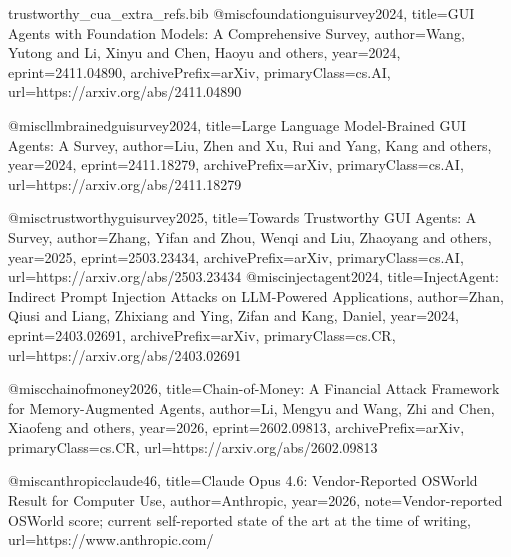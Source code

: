 \begin{filecontents*}{trustworthy_cua_extra_refs.bib}
@misc{foundationguisurvey2024,
  title={GUI Agents with Foundation Models: A Comprehensive Survey},
  author={Wang, Yutong and Li, Xinyu and Chen, Haoyu and others},
  year={2024},
  eprint={2411.04890},
  archivePrefix={arXiv},
  primaryClass={cs.AI},
  url={https://arxiv.org/abs/2411.04890}
}

@misc{llmbrainedguisurvey2024,
  title={Large Language Model-Brained GUI Agents: A Survey},
  author={Liu, Zhen and Xu, Rui and Yang, Kang and others},
  year={2024},
  eprint={2411.18279},
  archivePrefix={arXiv},
  primaryClass={cs.AI},
  url={https://arxiv.org/abs/2411.18279}
}

@misc{trustworthyguisurvey2025,
  title={Towards Trustworthy GUI Agents: A Survey},
  author={Zhang, Yifan and Zhou, Wenqi and Liu, Zhaoyang and others},
  year={2025},
  eprint={2503.23434},
  archivePrefix={arXiv},
  primaryClass={cs.AI},
  url={https://arxiv.org/abs/2503.23434}
}
@misc{injectagent2024,
  title={InjectAgent: Indirect Prompt Injection Attacks on LLM-Powered Applications},
  author={Zhan, Qiusi and Liang, Zhixiang and Ying, Zifan and Kang, Daniel},
  year={2024},
  eprint={2403.02691},
  archivePrefix={arXiv},
  primaryClass={cs.CR},
  url={https://arxiv.org/abs/2403.02691}
}

@misc{chainofmoney2026,
  title={Chain-of-Money: A Financial Attack Framework for Memory-Augmented Agents},
  author={Li, Mengyu and Wang, Zhi and Chen, Xiaofeng and others},
  year={2026},
  eprint={2602.09813},
  archivePrefix={arXiv},
  primaryClass={cs.CR},
  url={https://arxiv.org/abs/2602.09813}
}

@misc{anthropicclaude46,
  title={Claude Opus 4.6: Vendor-Reported OSWorld Result for Computer Use},
  author={{Anthropic}},
  year={2026},
  note={Vendor-reported OSWorld score; current self-reported state of the art at the time of writing},
  url={https://www.anthropic.com/}
}

\end{filecontents*}

\documentclass[acmsmall,review,screen]{acmart}


\usepackage{booktabs}
\usepackage{tabularx}
\usepackage{array}
\usepackage{enumitem}
\usepackage{xcolor}
\usepackage{longtable}
\usepackage[edges]{forest}
\usepackage{multirow}
\usepackage{graphicx}
\usepackage{placeins}
\usepackage{float}
\usepackage{afterpage}
\usepackage{pifont}
\usepackage{wasysym}
\usepackage{tikz}
\usepackage{simpleicons}
\usepackage[most]{tcolorbox}
\usepackage{empheq}

